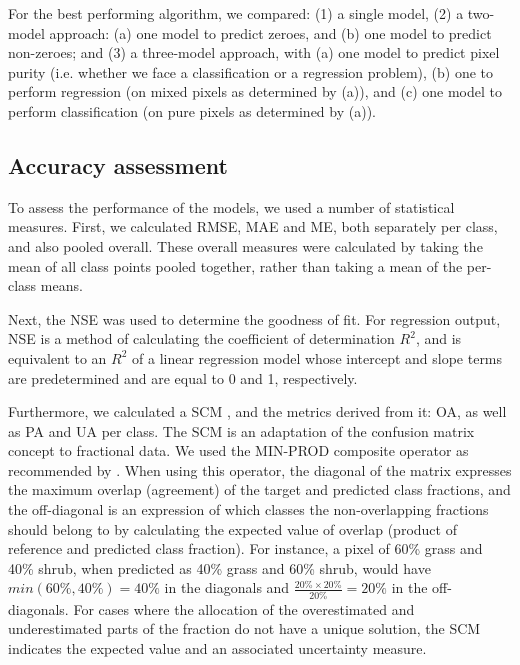 \documentclass[review,authoryear,3p]{elsarticle}
\begin{document}
For the best performing algorithm, we compared: (1) a single model, (2) a two-model approach: (a) one model to predict zeroes, and (b) one model to predict non-zeroes; and (3) a three-model approach, with (a) one model to predict pixel purity (i.e. whether we face a classification or a regression problem), (b) one to perform regression (on mixed pixels as determined by (a)), and (c) one model to perform classification (on pure pixels as determined by (a)).

\subsection{Accuracy assessment}

To assess the performance of the models, we used a number of statistical measures.
First, we calculated \gls{RMSE}, \ac{MAE} and \ac{ME}, both separately per class, and also pooled overall.
These overall measures were calculated by taking the mean of all class points pooled together, rather than taking a mean of the per-class means.

Next, the \gls{NSE} \citep{nash1970river} was used to determine the goodness of fit.
For regression output, \ac{NSE} is a method of calculating the coefficient of determination $R^2$, and is equivalent to an $R^2$ of a linear regression model whose intercept and slope terms are predetermined and are equal to 0 and 1, respectively.

Furthermore, we calculated a \gls{SCM} \citep{silvan-cardenas_sub-pixel_2008}, and the metrics derived from it: \ac{OA}, as well as \ac{PA} and \ac{UA} per class.
The \gls{SCM} is an adaptation of the confusion matrix concept to fractional data.
We used the MIN-PROD composite operator as recommended by \citet{silvan-cardenas_sub-pixel_2008}.
When using this operator, the diagonal of the matrix expresses the maximum overlap (agreement) of the target and predicted class fractions, and the off-diagonal is an expression of which classes the non-overlapping fractions should belong to by calculating the expected value of overlap (product of reference and predicted class fraction).
For instance, a pixel of 60\% grass and 40\% shrub, when predicted as 40\% grass and 60\% shrub, would have $min(60\%, 40\%)=40\%$ in the diagonals and $\frac{20\%\times20\%}{20\%}=20\%$ in the off-diagonals.
For cases where the allocation of the overestimated and underestimated parts of the fraction do not have a unique solution, the \ac{SCM} indicates the expected value and an associated uncertainty measure.
\end{document}
